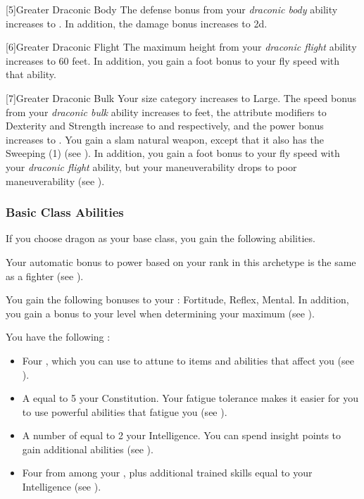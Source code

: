             [5]{Greater Draconic Body} The defense bonus from your \textit{draconic body} ability increases to .
            In addition, the damage bonus increases to \plus2d.

            [6]{Greater Draconic Flight} The maximum height from your \textit{draconic flight} ability increases to 60 feet.
            In addition, you gain a  foot bonus to your fly speed with that ability.

            [7]{Greater Draconic Bulk} Your size category increases to Large.
            The speed bonus from your \textit{draconic bulk} ability increases to  feet, the attribute modifiers to Dexterity and Strength increase to  and  respectively, and the power bonus increases to .
            You gain a slam natural weapon, except that it also has the Sweeping (1)  (see ).
            In addition, you gain a  foot bonus to your fly speed with your \textit{draconic flight} ability, but your maneuverability drops to poor maneuverability (see ).

        \subsubsection{Basic Class Abilities}
            If you choose dragon as your base class, you gain the following abilities.

             Your automatic bonus to power based on your rank in this archetype is the same as a fighter (see ).

            You gain the following bonuses to your :  Fortitude,  Reflex,  Mental.
            In addition, you gain a  bonus to your level when determining your maximum  (see ).

             You have the following :
            \begin{itemize}
                \item Four , which you can use to attune to items and abilities that affect you (see ).
                \item A  equal to 5 \add your Constitution.
                    Your fatigue tolerance makes it easier for you to use powerful abilities that fatigue you (see ).
                \item A number of  equal to 2 \add your Intelligence.
                    You can spend insight points to gain additional abilities (see ).
                \item Four  from among your , plus additional trained skills equal to your Intelligence (see ).
            \end{itemize}

